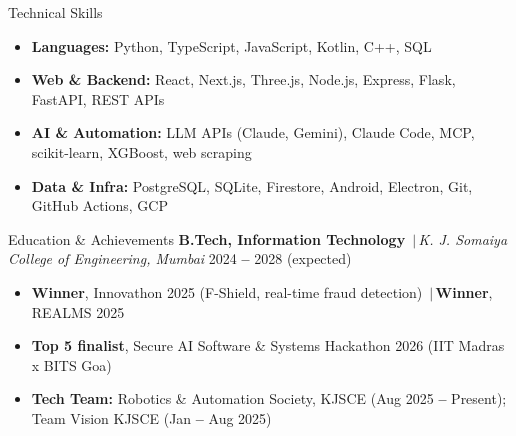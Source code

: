 \documentclass{resume}
\newcommand{\daterange}{\textbf{--}}
\newcommand{\sep}{\,$|$\,}
\begin{document}
\begin{rSection}{Technical Skills}
\begin{itemize}
  \itemsep -2pt
  \item \textbf{Languages:} Python, TypeScript, JavaScript, Kotlin, C++, SQL
  \item \textbf{Web \& Backend:} React, Next.js, Three.js, Node.js, Express, Flask, FastAPI, REST APIs
  \item \textbf{AI \& Automation:} LLM APIs (Claude, Gemini), Claude Code, MCP, scikit-learn, XGBoost, web scraping
  \item \textbf{Data \& Infra:} PostgreSQL, SQLite, Firestore, Android, Electron, Git, GitHub Actions, GCP
\end{itemize}
\end{rSection}

\begin{rSection}{Education \& Achievements}
\textbf{B.Tech, Information Technology} \sep \textit{K. J. Somaiya College of Engineering, Mumbai} \hfill {\small 2024 \daterange{} 2028 (expected)}
\begin{itemize}
  \itemsep -2pt
  \item \textbf{Winner}, Innovathon 2025 (F-Shield, real-time fraud detection) \sep \textbf{Winner}, REALMS 2025
  \item \textbf{Top 5 finalist}, Secure AI Software \& Systems Hackathon 2026 (IIT Madras x BITS Goa)
  \item \textbf{Tech Team:} Robotics \& Automation Society, KJSCE (Aug 2025 \daterange{} Present); Team Vision KJSCE (Jan \daterange{} Aug 2025)
\end{itemize}
\end{rSection}
\end{document}
